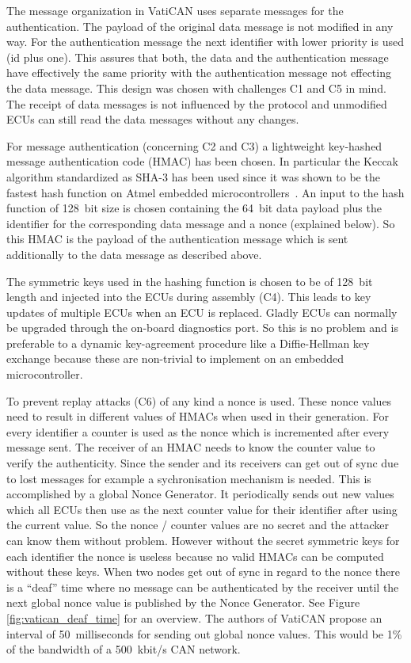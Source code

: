 The message organization in VatiCAN uses separate messages for the
authentication. The payload of the original data message is not modified in any
way. For the authentication message the next identifier with lower priority is
used (id plus one). This assures that both, the data and the authentication
message have effectively the same priority with the authentication message
not effecting the data message. This design was chosen with challenges C1 and C5
in mind. The receipt of data messages is not influenced by the protocol and
unmodified ECUs can still read the data messages without any changes.

For message authentication (concerning C2 and C3) a lightweight key-hashed
message authentication code (HMAC) has been chosen. In particular the Keccak
algorithm standardized as SHA-3 has been used since it was shown to be the
fastest hash function on Atmel embedded microcontrollers~\cite{Eisenbarth2012}.
An input to the hash function of 128~bit size is chosen containing the 64~bit
data payload plus the identifier for the corresponding data message and a nonce
(explained below). So this HMAC is the payload of the authentication message
which is sent additionally to the data message as described above.

The symmetric keys used in the hashing function is chosen to be of 128~bit
length and injected into the ECUs during assembly (C4). This leads to key
updates of multiple ECUs when an ECU is replaced. Gladly ECUs can normally be
upgraded through the on-board diagnostics port. So this is no problem and is
preferable to a dynamic key-agreement procedure like a Diffie-Hellman key
exchange because these are non-trivial to implement on an embedded
microcontroller.

To prevent replay attacks (C6) of any kind a nonce is used. These nonce values
need to result in different values of HMACs when used in their generation. For
every identifier a counter is used as the nonce which is incremented after every
message sent. The receiver of an HMAC needs to know the counter value to verify
the authenticity. Since the sender and its receivers can get out of sync due to
lost messages for example a sychronisation mechanism is needed. This is
accomplished by a global Nonce Generator. It periodically sends out new values
which all ECUs then use as the next counter value for their identifier after
using the current value. So the nonce / counter values are no secret and the
attacker can know them without problem. However without the secret symmetric
keys for each identifier the nonce is useless because no valid HMACs can be
computed without these keys. When two nodes get out of sync in regard to the
nonce there is a ``deaf'' time where no message can be authenticated by the
receiver until the next global nonce value is published by the Nonce Generator.
See Figure \ref{fig:vatican_deaf_time} for an overview. The authors of VatiCAN
propose an interval of 50~milliseconds for sending out global nonce values. This
would be 1\% of the bandwidth of a 500~kbit/s CAN network.

